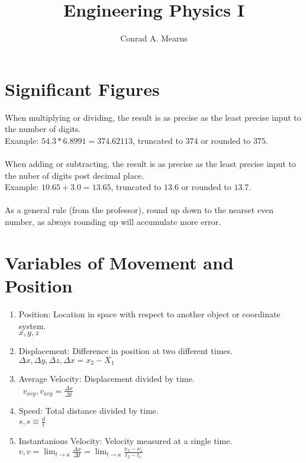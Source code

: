 \documentclass{article}
\title{Engineering Physics I}
\author{Conrad A. Mearns}
\begin{document}
\maketitle

\section{Significant Figures}
When multiplying or dividing, the result is as precise as the least precise input to the number of digits.\\
Example: $54.3 * 6.8991 = 374.62113$, truncated to $374$ or rounded to $375$.\\\\

When adding or subtracting, the result is as precise as the least precise input to the nuber of digits post decimal place.\\
Example: $10.65 + 3.0 = 13.65$, truncated to $13.6$ or rounded to $13.7$.\\\\

As a general rule (from the professor), round up down to the nearset even number, as always rounding up will accumulate more error.

\section{Variables of Movement and Position}
\begin{enumerate}
  \item Position: Location in space with respect to another object or coordinate system.\\
    $x, y, z$
  \item Displacement: Difference in position at two different times.\\
    $\Delta x, \Delta y, \Delta z, \Delta x = x_2 - X_1$
  \item Average Velocity: Displacement divided by time.\\\
    $v_{avg}, v_{avg} = \frac{\Delta x}{\Delta t}$
  \item Speed: Total distance divided by time.\\
    $s, s \equiv \frac{d}{t}$
  \item Instantanious Velocity: Velocity measured at a single time.\\
    $v, v = \lim_{t \to a}\frac{\Delta x}{\Delta t} = \lim_{t \to a}\frac{x_2 - x_1}{t_2 - t_1}$
\end{enumerate}
\end{document}
